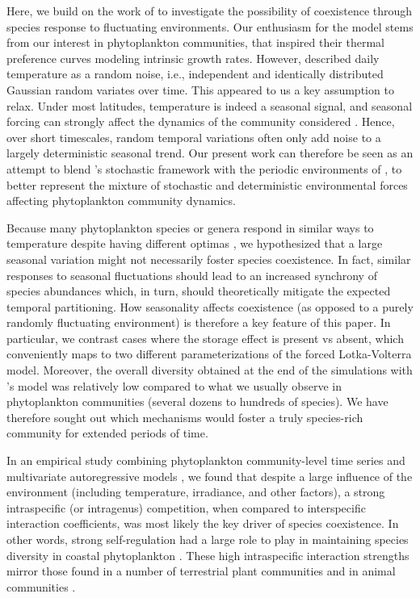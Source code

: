 \documentclass[smallcondensed,referee]{svjour3}       %
\begin{document}
Here, we build on the work of \citet{scranton_coexistence_2016} to
investigate the possibility of coexistence through species response
to fluctuating environments. Our enthusiasm for the \citet{scranton_coexistence_2016}
model stems from our interest in phytoplankton communities, that inspired
their thermal preference curves modeling intrinsic growth rates. However,
\citet{scranton_coexistence_2016} described daily temperature as
a random noise, i.e., independent and identically distributed Gaussian
random variates over time. This appeared to us a key assumption to
relax. Under most latitudes, temperature is indeed a seasonal signal,
and seasonal forcing can strongly affect the dynamics of the community
considered \citep{vesipa_impact_2017}. Hence, over short timescales,
random temporal variations often only add noise to a largely deterministic
seasonal trend. Our present work can therefore be seen as an attempt
to blend \citet{scranton_coexistence_2016}'s stochastic framework
with the periodic environments of \citet{barabas_community_2012},
to better represent the mixture of stochastic and deterministic environmental
forces affecting phytoplankton community dynamics. 

Because many phytoplankton species or genera respond in similar ways
to temperature despite having different optimas \citep{moisan_modelling_2002},
we hypothesized that a large seasonal variation might not necessarily
foster species coexistence. In fact, similar responses to seasonal
fluctuations should lead to an increased synchrony of species abundances
which, in turn, should theoretically mitigate the expected temporal
partitioning. How seasonality affects coexistence (as opposed to a
purely randomly fluctuating environment) is therefore a key feature
of this paper. In particular, we contrast cases where the storage
effect is present vs absent, which conveniently maps to two different
parameterizations of the forced Lotka-Volterra model. Moreover, the
overall diversity obtained at the end of the simulations with \citet{scranton_coexistence_2016}'s
model was relatively low compared to what we usually observe in phytoplankton
communities (several dozens to hundreds of species). We have therefore
sought out which mechanisms would foster a truly species-rich community
for extended periods of time. 

In an empirical study combining phytoplankton community-level time
series and multivariate autoregressive models \citep{barraquand2018coastal},
we found that despite a large influence of the environment (including
temperature, irradiance, and other factors), a strong intraspecific
(or intragenus) competition, when compared to interspecific interaction
coefficients, was most likely the key driver of species coexistence.
In other words, strong self-regulation had a large role to play in
maintaining species diversity in coastal phytoplankton \citep{barraquand2018coastal}.
These high intraspecific interaction strengths mirror those found
in a number of terrestrial plant communities \citep{adler_competition_2018}
and in animal communities \citep{mutshinda_what_2009}.
\end{document}
